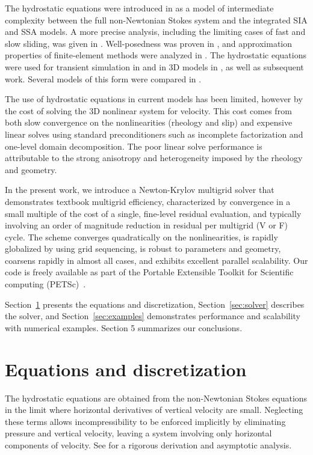\documentclass[3p]{elsarticle}
\begin{document}
The hydrostatic equations were introduced in \cite{blatter1995vas} as a model of intermediate complexity between the full non-Newtonian Stokes system and the integrated SIA and SSA models.  A more precise analysis, including the limiting cases of fast and slow sliding, was given in \cite{schoof2010thin}.  Well-posedness was proven in \cite{colinge1999strongly}, and approximation properties of finite-element methods were analyzed in \cite{glowinski2003approximation,chow2004finite}.  The hydrostatic equations were used for transient simulation in \cite{pattyn2002tgr} and in 3D models in \cite{pattyn2003ntd}, as well as subsequent work. Several models of this form were compared in \cite{pattyn2008beh}.

The use of hydrostatic equations in current models has been limited, however by the cost of solving the 3D nonlinear system for velocity.  This cost comes from both slow convergence on the
nonlinearities (rheology and slip) and expensive linear solves using standard preconditioners such
as incomplete factorization and one-level domain decomposition.  The poor linear solve performance is
attributable to the strong anisotropy and heterogeneity imposed by the rheology and geometry.

In the present work, we introduce a Newton-Krylov multigrid solver that demonstrates textbook
multigrid efficiency, characterized by convergence in a small multiple of the cost of a single,
fine-level residual evaluation, and typically involving an order of magnitude reduction in residual
per multigrid (V or F) cycle.  The scheme converges quadratically on the nonlinearities, is rapidly
globalized by using grid sequencing, is robust to parameters and geometry, coarsens rapidly in
almost all cases, and exhibits excellent parallel scalability.  Our code is freely available as part
of the Portable Extensible Toolkit for Scientific computing (PETSc)~\cite{petsc-web-page}.

Section~\ref{sec:equations} presents the equations and discretization, Section~\ref{sec:solver} describes the solver, and Section~\ref{sec:examples} demonstrates performance and scalability with numerical examples. Section 5 summarizes our conclusions.

\section{Equations and discretization}\label{sec:equations}
The hydrostatic equations are obtained from the non-Newtonian Stokes equations in the limit where
horizontal derivatives of vertical velocity are small.  Neglecting these terms allows
incompressibility to be enforced implicitly by eliminating pressure and vertical velocity, leaving a
system involving only horizontal components of velocity.  See \cite{schoof2010thin} for a rigorous
derivation and asymptotic analysis.
\end{document}
